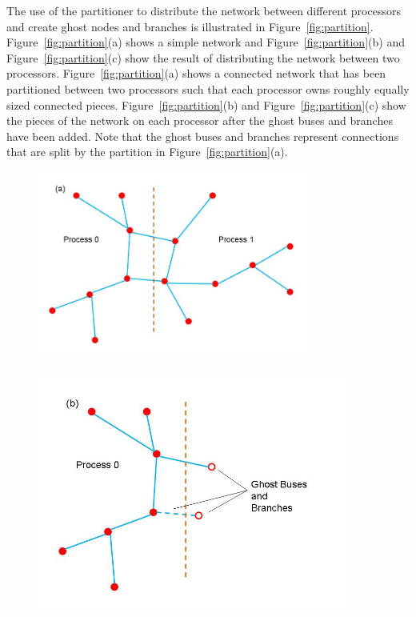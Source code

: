 The use of the partitioner to distribute the network between different
processors and create ghost nodes and branches is illustrated in
Figure~\ref{fig:partition}. Figure~\ref{fig:partition}(a) shows a simple network
and Figure~\ref{fig:partition}(b) and Figure~\ref{fig:partition}(c) show the
result of distributing the network between two processors.
Figure~\ref{fig:partition}(a) shows a connected network that has been
partitioned between two processors such that each processor owns roughly equally
sized connected pieces. Figure~\ref{fig:partition}(b) and
Figure~\ref{fig:partition}(c) show the pieces of the network on each processor
after the ghost buses and branches have been added. Note that the ghost buses
and branches represent connections that are split by the partition in
Figure~\ref{fig:partition}(a).

\begin{figure}
  \centering
    \includegraphics*[width=3.5in, keepaspectratio=true, trim=0.00in 0.30in 0.00in 0.40in]{figures/PartitionFull}
    \includegraphics*[width=4in, height=3.55in, keepaspectratio=true]{figures/Partition0}

\end{figure}
